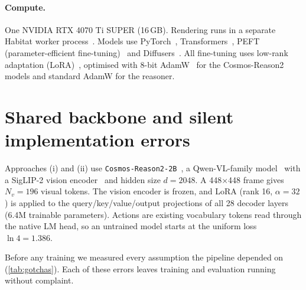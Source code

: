 \documentclass[11pt]{article}
\begin{document}
\paragraph{Compute.}
One NVIDIA RTX 4070 Ti SUPER (16\,GB). Rendering runs in a separate Habitat worker process~\citep{savva2019habitat}.
Models use PyTorch~\citep{paszke2019pytorch}, Transformers~\citep{wolf2020transformers}, PEFT (parameter-efficient fine-tuning)~\citep{mangrulkar2022peft}
and Diffusers~\citep{vonplaten2022diffusers}. All fine-tuning uses low-rank adaptation (LoRA)~\citep{hu2021lora}, optimised with 8-bit AdamW~\citep{loshchilov2019adamw,
dettmers2022optim8bit} for the Cosmos-Reason2 models and standard AdamW for the reasoner.

\section{Shared backbone and silent implementation errors}
\label{sec:gotchas}

Approaches (i) and (ii) use \texttt{Cosmos-Reason2-2B}~\citep{nvidia2025cosmosreason2}, a Qwen-VL-family
model~\citep{wang2024qwen2vl} with a SigLIP-2 vision encoder~\citep{tschannen2025siglip2} and hidden size $d{=}2048$.
A 448$\times$448 frame gives $N_v{=}196$ visual tokens. The vision encoder is frozen, and LoRA (rank 16,
$\alpha{=}32$) is applied to the query/key/value/output projections of all 28 decoder layers (6.4M trainable
parameters). Actions are existing vocabulary tokens read through the native LM head, so an untrained model
starts at the uniform loss $\ln 4 = 1.386$.

Before any training we measured every assumption the pipeline depended on (\cref{tab:gotchas}). Each of these errors
leaves training and evaluation running without complaint.
\end{document}
